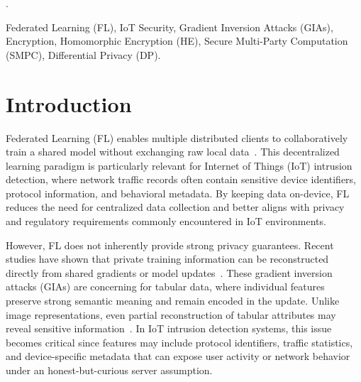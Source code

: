 \documentclass[journal,twoside,web]{ieeecolor}
\begin{document}
\begin{abstract}
  
\end{abstract}

.

\begin{IEEEkeywords}
Federated Learning (FL), IoT Security, Gradient Inversion Attacks (GIAs), Encryption, Homomorphic Encryption (HE), Secure Multi-Party Computation (SMPC), Differential Privacy (DP).
\end{IEEEkeywords}


\section{Introduction}
\label{sec:introduction}
Federated Learning (FL) enables multiple distributed clients to collaboratively train a shared model without exchanging raw local data~\cite{mcmahan2017fedavg}. This decentralized learning paradigm is particularly relevant for Internet of Things (IoT) intrusion detection, where network traffic records often contain sensitive device identifiers, protocol information, and behavioral metadata. By keeping data on-device, FL reduces the need for centralized data collection and better aligns with privacy and regulatory requirements commonly encountered in IoT environments.

However, FL does not inherently provide strong privacy guarantees. Recent studies have shown that private training information can be reconstructed directly from shared gradients or model updates~\cite{zhu2019dlg,geiping2020inverting}. These gradient inversion attacks (GIAs) are concerning for tabular data, where individual features preserve strong semantic meaning and remain encoded in the update. Unlike image representations, even partial reconstruction of tabular attributes may reveal sensitive information~\cite{vero2023tableak}. In IoT intrusion detection systems, this issue becomes critical since features may include protocol identifiers, traffic statistics, and device-specific metadata that can expose user activity or network behavior under an honest-but-curious server assumption.
\end{document}
